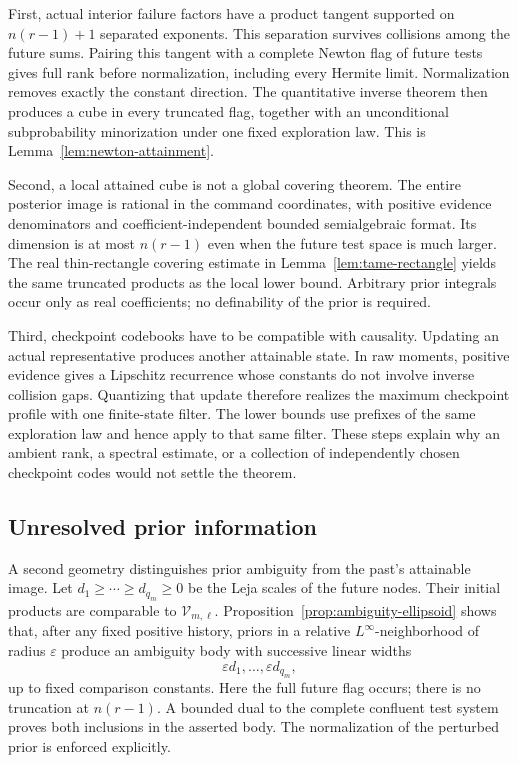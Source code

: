 First, actual interior failure factors have a product tangent supported
on $n(r-1)+1$ separated exponents. This separation survives collisions
among the future sums. Pairing this tangent with a complete Newton flag
of future tests gives full rank before normalization, including every
Hermite limit. Normalization removes exactly the constant direction.
The quantitative inverse theorem then produces a cube in every truncated
flag, together with an unconditional subprobability minorization under
one fixed exploration law. This is Lemma~\ref{lem:newton-attainment}.

Second, a local attained cube is not a global covering theorem. The
entire posterior image is rational in the command coordinates, with
positive evidence denominators and coefficient-independent bounded
semialgebraic format. Its dimension is at most $n(r-1)$ even when the
future test space is much larger. The real thin-rectangle covering
estimate in Lemma~\ref{lem:tame-rectangle} yields the same truncated
products as the local lower bound. Arbitrary prior integrals occur only
as real coefficients; no definability of the prior is required.

Third, checkpoint codebooks have to be compatible with causality.
Updating an actual representative produces another attainable state.
In raw moments, positive evidence gives a Lipschitz recurrence whose
constants do not involve inverse collision gaps. Quantizing that update
therefore realizes the maximum checkpoint profile with one finite-state
filter. The lower bounds use prefixes of the same exploration law and
hence apply to that same filter. These steps explain why an ambient
rank, a spectral estimate, or a collection of independently chosen
checkpoint codes would not settle the theorem.

\subsection{Unresolved prior information}
A second geometry distinguishes prior ambiguity from the past's
attainable image. Let $d_1\ge\cdots\ge d_{q_m}\ge0$ be the Leja
scales of the future nodes. Their initial products are comparable to
$\mathcal V_{m,\ell}$. Proposition~\ref{prop:ambiguity-ellipsoid}
shows that, after any fixed positive history, priors in a relative
$L^\infty$-neighborhood of radius $\varepsilon$ produce an ambiguity
body with successive linear widths
\[
 \varepsilon d_1,\ldots,\varepsilon d_{q_m},
\]
up to fixed comparison constants. Here the full future flag occurs;
there is no truncation at $n(r-1)$. A bounded dual to the complete
confluent test system proves both inclusions in the asserted body.
The normalization of the perturbed prior is enforced explicitly.


